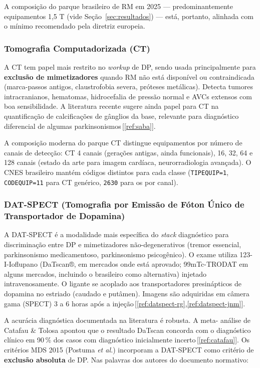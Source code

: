 \documentclass[12pt,a4paper,oneside]{article}
\begin{document}
A composição do parque brasileiro de RM em 2025 — predominantemente
equipamentos 1,5 T (vide Seção~\ref{sec:resultados}) — está,
portanto, alinhada com o mínimo recomendado pela diretriz europeia.

\subsubsection{Tomografia Computadorizada (CT)}

A CT tem papel mais restrito no \textit{workup} de DP, sendo usada
principalmente para \textbf{exclusão de mimetizadores} quando RM não
está disponível ou contraindicada (marca-passos antigos,
claustrofobia severa, próteses metálicas). Detecta tumores
intracranianos, hematomas, hidrocefalia de pressão normal e AVCs
extensos com boa sensibilidade. A literatura recente sugere ainda
papel para CT na quantificação de calcificações de gânglios da base,
relevante para diagnóstico diferencial de algumas
parkinsonismos\,[\ref{ref:saba}].

A composição moderna do parque CT distingue equipamentos por número
de canais de detecção: CT 4 canais (gerações antigas, ainda
funcionais), 16, 32, 64 e 128 canais (estado da arte para imagem
cardíaca, neurorradiologia avançada). O CNES brasileiro mantém códigos
distintos para cada classe (\texttt{TIPEQUIP=1}, \texttt{CODEQUIP=11}
para CT genérico, \texttt{26}\textendash \texttt{30} para os por canal).

\subsubsection{DAT-SPECT (Tomografia por Emissão de Fóton Único de
Transportador de Dopamina)}

A DAT-SPECT é a modalidade mais específica do \textit{stack}
diagnóstico para discriminação entre DP e mimetizadores
não-degenerativos (tremor essencial, parkinsonismo
medicamentoso, parkinsonismo psicogênico). O exame utiliza
123-I-Ioflupano (DaTscan®, em mercados onde está aprovado;
99mTc-TRODAT em alguns mercados, incluindo o brasileiro como
alternativa) injetado intravenosamente. O ligante se acoplado aos
transportadores presinápticos de dopamina no estriado (caudado e
putâmen). Imagens são adquiridas em câmera gama (SPECT) 3 a 6 horas
após a injeção\,[\ref{ref:datspect-rg},\ref{ref:datspect-jnm}].

A acurácia diagnóstica documentada na literatura é robusta. A meta-
análise de Catafau \& Tolosa apontou que o resultado DaTscan
concorda com o diagnóstico clínico em 90\,\% dos casos com diagnóstico
inicialmente incerto\,[\ref{ref:catafau}]. Os critérios MDS 2015
(Postuma \textit{et al.}) incorporam a DAT-SPECT como critério de
\textbf{exclusão absoluta} de DP. Nas palavras dos autores do
documento normativo:
\end{document}
